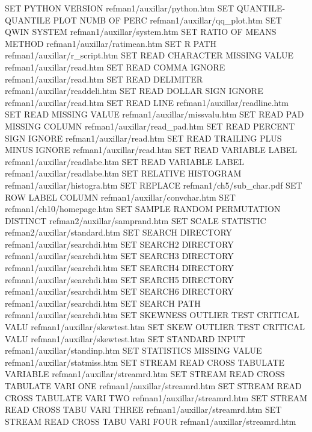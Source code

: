 SET PYTHON VERSION                      refman1/auxillar/python.htm
SET QUANTILE-QUANTILE PLOT NUMB OF PERC refman1/auxillar/qq_plot.htm
SET QWIN SYSTEM                         refman1/auxillar/system.htm
SET RATIO OF MEANS METHOD               refman1/auxillar/ratimean.htm
SET R PATH                              refman1/auxillar/r_script.htm
SET READ CHARACTER MISSING VALUE        refman1/auxillar/read.htm
SET READ COMMA IGNORE                   refman1/auxillar/read.htm
SET READ DELIMITER                      refman1/auxillar/readdeli.htm
SET READ DOLLAR SIGN IGNORE             refman1/auxillar/read.htm
SET READ LINE                           refman1/auxillar/readline.htm
SET READ MISSING VALUE                  refman1/auxillar/missvalu.htm
SET READ PAD MISSING COLUMN             refman1/auxillar/read_pad.htm
SET READ PERCENT SIGN IGNORE            refman1/auxillar/read.htm
SET READ TRAILING PLUS MINUS IGNORE     refman1/auxillar/read.htm
SET READ VARIABLE LABEL                 refman1/auxillar/readlabe.htm
SET READ VARIABLE LABEL                 refman1/auxillar/readlabe.htm
SET RELATIVE HISTOGRAM                  refman1/auxillar/histogra.htm
SET REPLACE                             refman1/ch5/sub_char.pdf
SET ROW LABEL COLUMN                    refman1/auxillar/convchar.htm
SET                                     refman1/ch10/homepage.htm
SET SAMPLE RANDOM PERMUTATION DISTINCT  refman2/auxillar/samprand.htm
SET SCALE STATISTIC                     refman2/auxillar/standard.htm
SET SEARCH DIRECTORY                    refman1/auxillar/searchdi.htm
SET SEARCH2 DIRECTORY                   refman1/auxillar/searchdi.htm
SET SEARCH3 DIRECTORY                   refman1/auxillar/searchdi.htm
SET SEARCH4 DIRECTORY                   refman1/auxillar/searchdi.htm
SET SEARCH5 DIRECTORY                   refman1/auxillar/searchdi.htm
SET SEARCH6 DIRECTORY                   refman1/auxillar/searchdi.htm
SET SEARCH PATH                         refman1/auxillar/searchdi.htm
SET SKEWNESS OUTLIER TEST CRITICAL VALU refman1/auxillar/skewtest.htm
SET SKEW     OUTLIER TEST CRITICAL VALU refman1/auxillar/skewtest.htm
SET STANDARD INPUT                      refman1/auxillar/standinp.htm
SET STATISTICS MISSING VALUE            refman1/auxillar/statmiss.htm
SET STREAM READ CROSS TABULATE VARIABLE refman1/auxillar/streamrd.htm
SET STREAM READ CROSS TABULATE VARI ONE refman1/auxillar/streamrd.htm
SET STREAM READ CROSS TABULATE VARI TWO refman1/auxillar/streamrd.htm
SET STREAM READ CROSS TABU VARI THREE   refman1/auxillar/streamrd.htm
SET STREAM READ CROSS TABU VARI FOUR    refman1/auxillar/streamrd.htm
